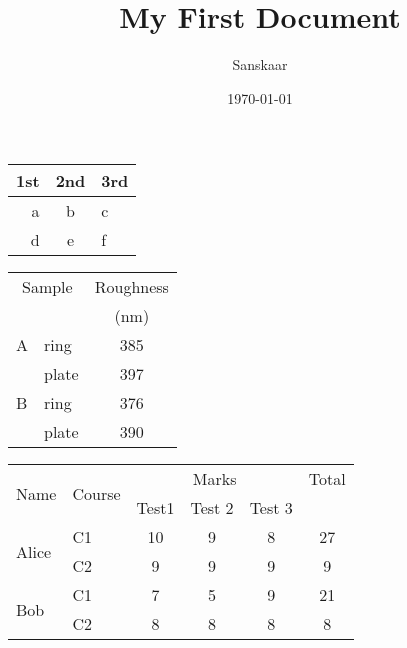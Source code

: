 \documentclass[a4paper,12pt]{report}
\begin{document}
	\title{My First Document}
	\author{Sanskaar}
	\date{\today}
	\maketitle
	\tableofcontents
	\newpage
	\begin{tabular}{r|cl}
	   1st & 2nd & 3rd\\
	   \hline
	   a & b & c\\
	   \cline{2-3}		
	   d & e & f\\
	\end{tabular}
\begin{tabular}{llc}
		\hline%
		\multicolumn{2}{c}{Sample}& Roughness\\
		 & &(nm)\\
		\hline%
		 A & ring & 385\\
		 \cline{2-3}
		 & plate & 397\\
		 \hline
		 B & ring &376\\
		 \cline{2-3}
		 &plate & 390\\
		 \hline
	\end{tabular}

\begin{tabular}{llcccc}
	\hline
	\multirow{2}{*}{Name} & \multirow{2}{*}{Course}&\multicolumn{3}{c}{Marks}& Total\\
	\cmidrule{3-5}
	& & Test1 &Test 2 &Test 3 &\\
	\toprule%
	\multirow{2}{*}{Alice}&C1 &10 &9& 8 &27\\
	\cmidrule(l){2-6}
	&C2&9&9&9&9\\
	\midrule
	\multirow{2}{*}{Bob}&C1&7&5&9&21\\
	\cmidrule(l){2-6}
	& C2 &8&8&8&8\\
	\bottomrule
\end{tabular}
\end{document}
